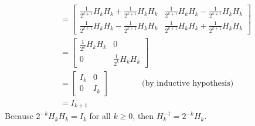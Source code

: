 \documentclass[11pt]{article}
\begin{document}
\begin{enumerate}[(a)]
\begin{align*}
&= \begin{bmatrix}\frac1{2^{k+1}}H_kH_k+\frac1{2^{k+1}}H_kH_k&\frac1{2^{k+1}}H_kH_k-\frac1{2^{k+1}}H_kH_k\\\frac1{2^{k+1}}H_kH_k-\frac1{2^{k+1}}H_kH_k&\frac1{2^{k+1}}H_kH_k+\frac1{2^{k+1}}H_kH_k\end{bmatrix} \\
&= \begin{bmatrix}\frac1{2^k}H_kH_k&0\\0&\frac1{2^k}H_kH_k\end{bmatrix} \\
&= \begin{bmatrix}I_k&0\\0&I_k\end{bmatrix} \qquad \qquad \text{(by inductive hypothesis)}\\
&= I_{k+1}
\end{align*}
Because $2^{-k}H_kH_k = I_k$ for all $k\geq 0$, then $H_k^{-1} = 2^{-k}H_k$.
\end{enumerate}


\newpage
\end{document}
